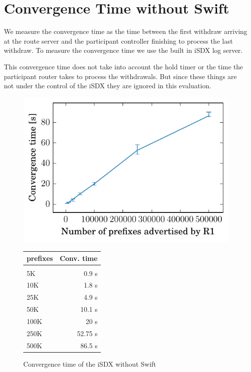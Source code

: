 \section{\label{chapter5:Convergence time without Swift}Convergence Time without Swift}

We measure the convergence time as the time between the first withdraw arriving at the route server and the participant controller finishing to process the last withdraw. To measure the convergence time we use the built in iSDX log server.

This convergence time does not take into account the hold timer or the time the participant router takes to process the withdrawals. But since these things are not under the control of the iSDX they are ignored in this evaluation.

\begin{figure}
\centering
\begin{minipage}[t]{.4\textwidth}
\centering
\vspace{0pt}
\includegraphics[scale = 1]{Figures/noswift.pdf}
\end{minipage}\hfill
\begin{minipage}[t]{.4\textwidth}
\centering
\vspace{0pt}
\begin{tabular}{@{}lr@{}}
	\\
	prefixes & Conv. time \\
	\hline
	\\
    5K & 0.9 s  \\
    10K & 1.8 s   \\
    25K & 4.9 s   \\
    50K & 10.1 s  \\
    100K & 20 s \\
    250K & 52.75 s   \\
    500K & 86.5 s  \\
\end{tabular}
\end{minipage}
\caption{Convergence time of the iSDX without Swift}
\label{fig:noswift}
\end{figure}

